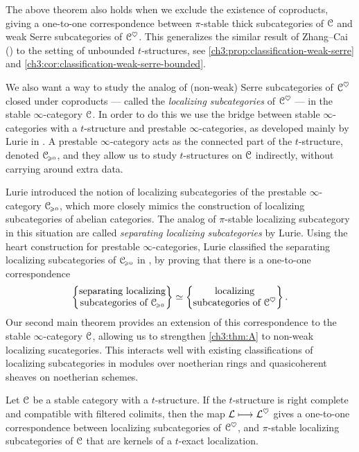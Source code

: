 The above theorem also holds when we exclude the existence of coproducts, giving a one-to-one correspondence between $\pi$-stable thick subcategories of $\EuScript{C}$ and weak Serre subcategories of $\EuScript{C}^\heartsuit$. This generalizes the similar result of Zhang--Cai (\cite{zhang-cai_2017}) to the setting of unbounded $t$-structures, see \cref{ch3:prop:classification-weak-serre} and \cref{ch3:cor:classification-weak-serre-bounded}. 

We also want a way to study the analog of (non-weak) Serre subcategories of $\EuScript{C}^\heartsuit$ closed under coproducts --- called the \emph{localizing subcategories} of $\EuScript{C}^\heartsuit$ --- in the stable $\infty$-category $\EuScript{C}$. In order to do this we use the bridge between stable $\infty$-categories with a $t$-structure and prestable $\infty$-categories, as developed mainly by Lurie in \cite[App. C]{lurie_SAG}. A prestable $\infty$-category acts as the connected part of the $t$-structure, denoted $\EuScript{C}_{\hspace{-1pt}\scriptscriptstyle\geqslant 0}$, and they allow us to study $t$-structures on $\EuScript{C}$ indirectly, without carrying around extra data. 

Lurie introduced the notion of localizing subcategories of the prestable $\infty$-category $\EuScript{C}_{\hspace{-1pt}\scriptscriptstyle\geqslant 0}$, which more closely mimics the construction of localizing subcategories of abelian categories. The analog of $\pi$-stable localizing subcategory in this situation are called \emph{separating localizing subcategories} by Lurie. Using the heart construction for prestable $\infty$-categories, Lurie classified the separating localizing subcategories of $\EuScript{C}_{\hspace{-1pt}\scriptscriptstyle\geqslant 0}$ in \cite[C.5.2.7]{lurie_SAG}, by proving that there is a one-to-one correspondence
\[\left\{ \begin{matrix} \text{separating localizing}\\ \text{subcategories of }\EuScript{C}_{\hspace{-1pt}\scriptscriptstyle\geqslant 0} \end{matrix} \right\} \simeq \left\{ \begin{matrix} \text{localizing}\\ \text{subcategories of }\EuScript{C}^\heartsuit \end{matrix} \right\}.\]
Our second main theorem provides an extension of this correspondence to the stable $\infty$-category $\EuScript{C}$, allowing us to strengthen \cref{ch3:thm:A} to non-weak localizing sucategories. This interacts well with existing classifications of localizing subcategories in modules over noetherian rings and quasicoherent sheaves on noetherian schemes. 


\begin{introthm}
    \label{ch3:thm:B}
    Let $\EuScript{C}$ be a stable category with a $t$-structure. If the $t$-structure is right complete and compatible with filtered colimits, then the map $\mathcal{L}\longmapsto \mathcal{L}^\heartsuit$ gives a one-to-one correspondence between localizing subcategories of $\EuScript{C}^\heartsuit$, and $\pi$-stable localizing subcategories of $\EuScript{C}$ that are kernels of a $t$-exact localization.
\end{introthm}

